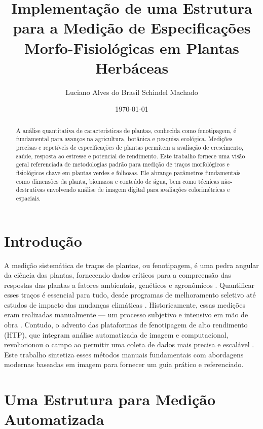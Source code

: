 \documentclass[12pt, a4paper]{article}
\title{Implementação de uma Estrutura para a Medição de Especificações Morfo-Fisiológicas em Plantas Herbáceas}
\author{Luciano Alves do Brasil Schindel Machado}
\date{\today}
\begin{document}
	
	\maketitle
	
	\begin{abstract}
		\noindent A análise quantitativa de características de plantas, conhecida como fenotipagem, é fundamental para avanços na agricultura, botânica e pesquisa ecológica. Medições precisas e repetíveis de especificações de plantas permitem a avaliação de crescimento, saúde, resposta ao estresse e potencial de rendimento. Este trabalho fornece uma visão geral referenciada de metodologias padrão para medição de traços morfológicos e fisiológicos chave em plantas verdes e folhosas. Ele abrange parâmetros fundamentais como dimensões da planta, biomassa e conteúdo de água, bem como técnicas não-destrutivas envolvendo análise de imagem digital para avaliações colorimétricas e espaciais.
	\end{abstract}
	
	\section{Introdução}
	
	A medição sistemática de traços de plantas, ou fenotipagem, é uma pedra angular da ciência das plantas, fornecendo dados críticos para a compreensão das respostas das plantas a fatores ambientais, genéticos e agronômicos \cite{Fiorani2013, Araus2014, Pieruschka2019}. Quantificar esses traços é essencial para tudo, desde programas de melhoramento seletivo até estudos de impacto das mudanças climáticas \cite{Furbank2011}. Historicamente, essas medições eram realizadas manualmente --- um processo subjetivo e intensivo em mão de obra \cite{Rahaman2015}. Contudo, o advento das plataformas de fenotipagem de alto rendimento (HTP), que integram análise automatizada de imagem e computacional, revolucionou o campo ao permitir uma coleta de dados mais precisa e escalável \cite{Cobb2013, Li2014}. Este trabalho sintetiza esses métodos manuais fundamentais com abordagens modernas baseadas em imagem para fornecer um guia prático e referenciado.
	
	\section{Uma Estrutura para Medição Automatizada}
	
\end{document}
